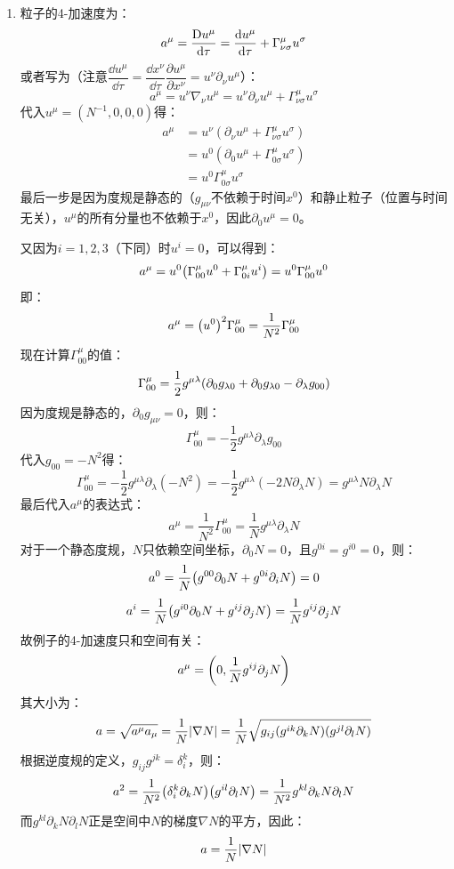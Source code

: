 \documentclass[a4paper]{article}
\begin{document}
\begin{enumerate}
    \bigskip
    \item[13.(b)]
    粒子的4-加速度为：
    \[
        a^\mu = \frac{\mathrm{D} u^\mu}{\dd \tau} = \dv{u^\mu}{\tau} + \Gamma^\mu_{\nu\sigma} u^\sigma
    \]
    或者写为（注意$\dfrac{\dd u^\mu}{\dd \tau} = \dfrac{\dd x^\nu}{\dd \tau} \dfrac{\partial u^\mu}{\partial x^\nu} = u^\nu \partial_\nu u^\mu$）：
    \[
        a^\mu = u^\nu \nabla_\nu u^\mu = u^\nu \partial_\nu u^\mu + \Gamma^\mu_{\nu\sigma} u^\sigma
    \]
    代入$u^\mu = (N^{-1}, 0, 0, 0)$得：
    \begin{align*}
        a^\mu
        &= u^\nu (\partial_\nu u^\mu + \Gamma^\mu_{\nu\sigma} u^\sigma) \\
        &= u^0 (\partial_0 u^\mu + \Gamma^\mu_{0\sigma} u^\sigma) \\
        &= u^0 \Gamma^\mu_{0\sigma} u^\sigma
    \end{align*}
    最后一步是因为度规是静态的（$g_{\mu\nu}$不依赖于时间$x^0$）和静止粒子（位置与时间无关），$u^\mu$的所有分量也不依赖于$x^0$，因此$\partial_0 u^\mu = 0$。

    又因为$i = 1,2,3$（下同）时$u^i = 0$，可以得到：
    \[
        a^\mu = u^0 \qty(\Gamma^\mu_{00} u^0 + \Gamma^\mu_{0i} u^i) = u^0 \Gamma^\mu_{00} u^0
    \]
    即：
    \[
        a^\mu = \qty(u^0)^2 \Gamma^\mu_{00} = \frac{1}{N^2} \Gamma^\mu_{00}
    \]
    现在计算$\Gamma^\mu_{00}$的值：
    \[
        \Gamma^\mu_{00} = \frac{1}{2}g^{\mu\lambda} \qty(\partial_0 g_{\lambda 0} + \partial_0 g_{\lambda 0} - \partial_\lambda g_{00})
    \]
    因为度规是静态的，$\partial_0 g_{\mu\nu} = 0$，则：
    \[
        \Gamma^\mu_{00} = -\frac{1}{2}g^{\mu\lambda} \partial_\lambda g_{00}
    \]
    代入$g_{00} = -N^2$得：
    \[
        \Gamma^\mu_{00} = -\frac{1}{2}g^{\mu\lambda} \partial_\lambda (-N^2) = -\frac{1}{2}g^{\mu\lambda} (-2N \partial_\lambda N) = g^{\mu\lambda} N \partial_\lambda N
    \]
    最后代入$a^\mu$的表达式：
    \[
        a^\mu = \frac{1}{N^2} \Gamma^\mu_{00} = \frac{1}{N} g^{\mu\lambda} \partial_\lambda N
    \]
    对于一个静态度规，$N$只依赖空间坐标，$\partial_0 N = 0$，且$g^{0i} = g^{i0} = 0$，则：
    \[
        a^0 = \frac{1}{N} \qty(g^{00} \partial_0 N + g^{0i} \partial_i N) = 0
    \]
    \[
        a^i = \frac{1}{N} \qty(g^{i0} \partial_0 N + g^{ij} \partial_j N) = \frac{1}{N} g^{ij} \partial_j N
    \]
    故例子的4-加速度只和空间有关：
    \[
        a^\mu = \qty(0, \frac{1}{N} g^{ij} \partial_j N)
    \]
    其大小为：
    \[
        a = \sqrt{a^\mu a_\mu} = \frac{1}{N} \abs{\nabla N} = \frac{1}{N} \sqrt{g_{ij} \qty(g^{ik} \partial_k N) \qty(g^{jl} \partial_l N)}
    \]
    根据逆度规的定义，$g_{ij} g^{jk} = \delta_i^k$，则：
    \[
        a^2 = \frac{1}{N^2} \qty(\delta_i^k \partial_k N) \qty(g^{il} \partial_l N) = \frac{1}{N^2} g^{kl} \partial_k N \partial_l N
    \]
    而$g^{kl} \partial_k N \partial_l N$正是空间中$N$的梯度$\nabla N$的平方，因此：
    \[
        a = \frac{1}{N} \abs{\nabla N}
    \]


\end{enumerate}
\end{document}
